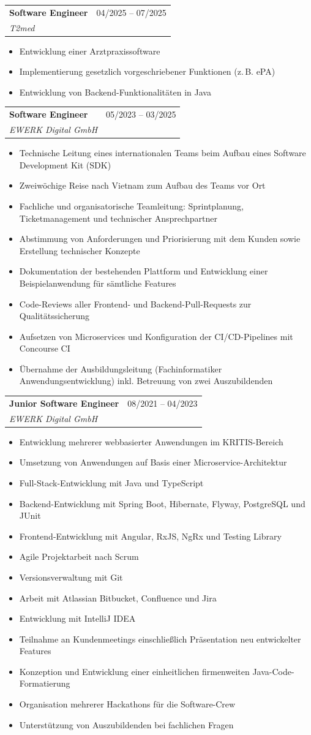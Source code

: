 \documentclass[a4paper,11pt]{article}
\makeatletter
\newcommand{\resumeItem}[1]{
  \item\small{
    {#1 \vspace{-2pt}}
  }
}
\newcommand{\resumeSubheading}[4]{
  \vspace{-2pt}\item
    \begin{tabular*}{0.97\textwidth}[t]{l@{\extracolsep{\fill}}r}
      \textbf{#1} & #2 \\
      \textit{\small#3} & \textit{\small #4} \\
    \end{tabular*}\vspace{-7pt}
}
\newcommand{\resumeItemListStart}{\begin{itemize}}
\newcommand{\resumeItemListEnd}{\end{itemize}\vspace{-5pt}}
\makeatother
\begin{document}
    \resumeSubheading
      {Software Engineer}{04/2025 -- 07/2025}
      {T2med}{}
      \resumeItemListStart
        \resumeItem{Entwicklung einer Arztpraxissoftware}
        \resumeItem{Implementierung gesetzlich vorgeschriebener Funktionen (z.\,B. ePA)}
        \resumeItem{Entwicklung von Backend-Funktionalitäten in Java}
      \resumeItemListEnd

    \resumeSubheading
      {Software Engineer}{05/2023 -- 03/2025}
      {EWERK Digital GmbH}{}
      \resumeItemListStart
        \resumeItem{Technische Leitung eines internationalen Teams beim Aufbau eines Software Development Kit (SDK)}
        \resumeItem{Zweiwöchige Reise nach Vietnam zum Aufbau des Teams vor Ort}
        \resumeItem{Fachliche und organisatorische Teamleitung: Sprintplanung, Ticketmanagement und technischer Ansprechpartner}
        \resumeItem{Abstimmung von Anforderungen und Priorisierung mit dem Kunden sowie Erstellung technischer Konzepte}
        \resumeItem{Dokumentation der bestehenden Plattform und Entwicklung einer Beispielanwendung für sämtliche Features}
        \resumeItem{Code-Reviews aller Frontend- und Backend-Pull-Requests zur Qualitätssicherung}
        \resumeItem{Aufsetzen von Microservices und Konfiguration der CI/CD-Pipelines mit Concourse CI}
        \resumeItem{Übernahme der Ausbildungsleitung (Fachinformatiker Anwendungsentwicklung) inkl. Betreuung von zwei Auszubildenden}
      \resumeItemListEnd

    \resumeSubheading
      {Junior Software Engineer}{08/2021 -- 04/2023}
      {EWERK Digital GmbH}{}
      \resumeItemListStart
        \resumeItem{Entwicklung mehrerer webbasierter Anwendungen im KRITIS-Bereich}
        \resumeItem{Umsetzung von Anwendungen auf Basis einer Microservice-Architektur}
        \resumeItem{Full-Stack-Entwicklung mit Java und TypeScript}
        \resumeItem{Backend-Entwicklung mit Spring Boot, Hibernate, Flyway, PostgreSQL und JUnit}
        \resumeItem{Frontend-Entwicklung mit Angular, RxJS, NgRx und Testing Library}
        \resumeItem{Agile Projektarbeit nach Scrum}
        \resumeItem{Versionsverwaltung mit Git}
        \resumeItem{Arbeit mit Atlassian Bitbucket, Confluence und Jira}
        \resumeItem{Entwicklung mit IntelliJ IDEA}
        \resumeItem{Teilnahme an Kundenmeetings einschließlich Präsentation neu entwickelter Features}
        \resumeItem{Konzeption und Entwicklung einer einheitlichen firmenweiten Java-Code-Formatierung}
        \resumeItem{Organisation mehrerer Hackathons für die Software-Crew}
        \resumeItem{Unterstützung von Auszubildenden bei fachlichen Fragen}
      \resumeItemListEnd
\end{document}
